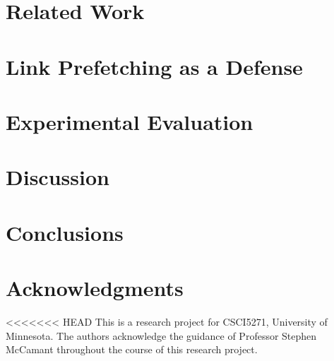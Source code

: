 \documentclass{sig-alternate-05-2015}
\begin{document}
\section{Related Work}


\section{Link Prefetching as a Defense}


\section{Experimental Evaluation}


\section{Discussion}


\section{Conclusions}



\section{Acknowledgments}
<<<<<<< HEAD
This is a research project for CSCI5271, University of Minnesota.
The authors acknowledge the guidance of Professor Stephen McCamant
throughout the course of this research project.



\end{document}
